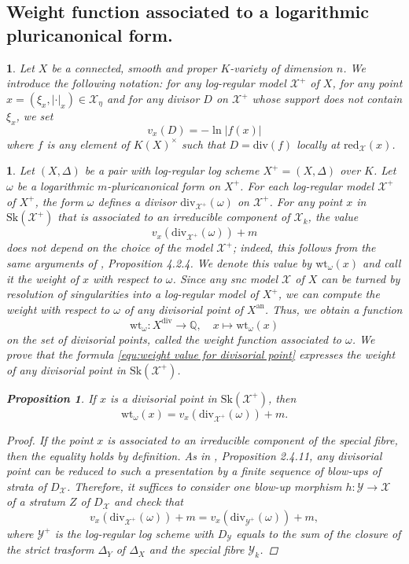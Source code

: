 \documentclass{amsart}%
\numberwithin{equation}{subsection}
\theoremstyle{plain2}
\newtheorem{prop}[equation]{Proposition}
\theoremstyle{definition2}
\theoremstyle{stepstyle}
\theoremstyle{point}
\theoremstyle{subpoint}
\newtheorem{subpoint}[equation]{}%
\newcommand{\spa}[1]{\begin{subpoint}#1\end{subpoint}}           %
\newcommand{\Q}{\ensuremath{\mathbb{Q}}}
\newcommand{\cX}{\ensuremath{\mathscr{X}}}
\newcommand{\cY}{\ensuremath{\mathscr{Y}}}
\renewcommand{\cY}{\ensuremath{\mathscr{Y}}}
\newcommand{\redu}{\mathrm{red}}
\newcommand{\an}{\mathrm{an}}
\newcommand{\divisor}{\mathrm{div}}
\newcommand{\weight}{\mathrm{wt}}
\newcommand{\Sk}{\mathrm{Sk}}
\begin{document}
\subsection{Weight function associated to a logarithmic pluricanonical form.}
\spa{Let $X$ be a connected, smooth and proper $K$-variety of dimension $n$. We introduce the following notation: for any log-regular model $\cX^+$ of $X$, for any point $x = (\xi_x,|\cdot|_x) \in \widehat{\cX_{\eta}}$ and for any divisor $D$ on $\cX^+$ whose support does not contain $\xi_x$, we set $$v_x(D) = - \ln |f(x)|$$ where $f$ is any element of $K(X)^\times$ such that $D= \divisor(f)$ locally at $\redu_{\cX}(x)$.}

\spa{Let $(X,\Delta)$ be a pair with log-regular log scheme $X^+=(X,\Delta)$ over $K$. Let $\omega$ be a logarithmic $m$-pluricanonical form on $X^+$. For each log-regular model $\cX^+$ of $X^+$, the form $\omega$ defines a divisor $\divisor_{\cX^+}(\omega)$ on $\cX^+$. For any point $x$ in $\Sk(\cX^+)$ that is associated to an irreducible component of $\cX_k$, the value \begin{equation} \label{equ:weight value for divisorial point}
v_x(\divisor_{\cX^+}(\omega)) +m
\end{equation} does not depend on the choice of the model $\cX^+$; indeed, this follows from the same arguments of \cite{MustataNicaise}, Proposition 4.2.4. We denote this value by $\weight_{\omega}(x)$ and call it the weight of $x$ with respect to $\omega$. Since any snc model $\cX$ of $X$ can be turned by resolution of singularities into a log-regular model of $X^+$, we can compute the weight with respect to $\omega$ of any divisorial point of $X^\an$. Thus, we obtain a function $$\weight_{\omega}: X^{\divisor} \rightarrow \Q, \quad x \mapsto \weight_{\omega}(x)$$ on the set of divisorial points, called the weight function associated to $\omega$. We prove that the formula \ref{equ:weight value for divisorial point} expresses the weight of any divisorial point in $\Sk(\cX^+)$.

\begin{prop} \label{prop weight function on log regular model}
If $x$ is a divisorial point in $\Sk(\cX^+)$, then $$\weight_{\omega}(x)=v_x(\divisor_{\cX^+}(\omega)) +m.$$
\end{prop}
\begin{proof}
If the point $x$ is associated to an irreducible component of the special fibre, then the equality holds by definition. As in \cite{MustataNicaise}, Proposition 2.4.11, any divisorial point can be reduced to such a presentation by a finite sequence of blow-ups of strata of $D_\cX$. Therefore, it suffices to consider one blow-up morphism $h:\cY \rightarrow \cX$ of a stratum $Z$ of $D_\cX$ and check that $$v_x(\divisor_{\cX^+}(\omega)) +m=v_x(\divisor_{\cY^+}(\omega)) +m,$$ where $\cY^+$ is the log-regular log scheme with $D_\cY$ equals to the sum of the closure of the strict trasform $\Delta_Y$ of $\Delta_X$ and the special fibre $\cY_k$.


\end{proof}}
\end{document}
